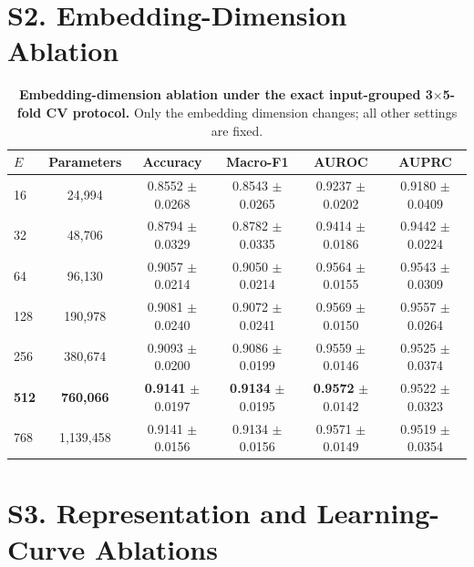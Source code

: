 \documentclass[11pt,a4paper]{article}
\begin{document}
\section*{S2. Embedding-Dimension Ablation}

\begin{table}[ht]
\centering
\caption{\textbf{Embedding-dimension ablation under the exact input-grouped 3$\times$5-fold CV protocol.}
Only the embedding dimension changes; all other settings are fixed.}
\label{tab:sup2}
\begin{tabular}{lccccc}
\toprule
\textbf{$E$} & \textbf{Parameters} & \textbf{Accuracy} & \textbf{Macro-F1} & \textbf{AUROC} & \textbf{AUPRC} \\
\midrule
16  & 24,994 & 0.8552 $\pm$ 0.0268 & 0.8543 $\pm$ 0.0265 & 0.9237 $\pm$ 0.0202 & 0.9180 $\pm$ 0.0409 \\
32  & 48,706 & 0.8794 $\pm$ 0.0329 & 0.8782 $\pm$ 0.0335 & 0.9414 $\pm$ 0.0186 & 0.9442 $\pm$ 0.0224 \\
64  & 96,130 & 0.9057 $\pm$ 0.0214 & 0.9050 $\pm$ 0.0214 & 0.9564 $\pm$ 0.0155 & 0.9543 $\pm$ 0.0309 \\
128 & 190,978 & 0.9081 $\pm$ 0.0240 & 0.9072 $\pm$ 0.0241 & 0.9569 $\pm$ 0.0150 & 0.9557 $\pm$ 0.0264 \\
256 & 380,674 & 0.9093 $\pm$ 0.0200 & 0.9086 $\pm$ 0.0199 & 0.9559 $\pm$ 0.0146 & 0.9525 $\pm$ 0.0374 \\
\textbf{512} & \textbf{760,066} & \textbf{0.9141} $\pm$ 0.0197 & \textbf{0.9134} $\pm$ 0.0195 & \textbf{0.9572} $\pm$ 0.0142 & 0.9522 $\pm$ 0.0323 \\
768 & 1,139,458 & 0.9141 $\pm$ 0.0156 & 0.9134 $\pm$ 0.0156 & 0.9571 $\pm$ 0.0149 & 0.9519 $\pm$ 0.0354 \\
\bottomrule
\end{tabular}
\end{table}

\section*{S3. Representation and Learning-Curve Ablations}
\end{document}
